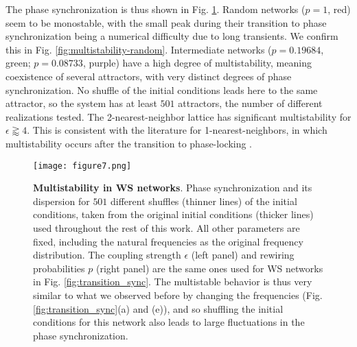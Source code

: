 The phase synchronization is thus shown in Fig. \ref{fig:multistability}. Random networks ($p = 1$, red) seem to be monostable, with the small peak during their transition to phase synchronization being a numerical difficulty due to long transients. We confirm this in Fig. \ref{fig:multistability-random}. Intermediate networks ($p = 0.19684$, green; $p = 0.08733$, purple) have a high degree of multistability, meaning coexistence of several attractors, with very distinct degrees of phase synchronization. No shuffle of the initial conditions leads here to the same attractor, so the system has at least $501$ attractors, the number of different realizations tested.
The 2-nearest-neighbor lattice has significant multistability for $\epsilon \gtrapprox 4$. This is consistent with the literature for 1-nearest-neighbors, in which multistability occurs after the transition to phase-locking \cite{tilles2011multistable}. 
%
\begin{figure}[htb!]
    \centering
    \texttt{[image: figure7.png]}
    \caption{\textbf{Multistability in WS networks}. Phase synchronization and its dispersion for $501$ different shuffles (thinner lines) of the initial conditions, taken from the original initial conditions (thicker lines) used throughout the rest of this work. All other parameters are fixed, including the natural frequencies as the original frequency distribution. The coupling strength $\epsilon$ (left panel) and rewiring probabilities $p$ (right panel) are the same ones used for WS networks in Fig. \ref{fig:transition_sync}. The multistable behavior is thus very similar to what we observed before by changing the frequencies (Fig. \ref{fig:transition_sync}(a) and (e)), and so shuffling the initial conditions for this network also leads to large fluctuations in the phase synchronization. }
    \label{fig:multistability}
\end{figure}

